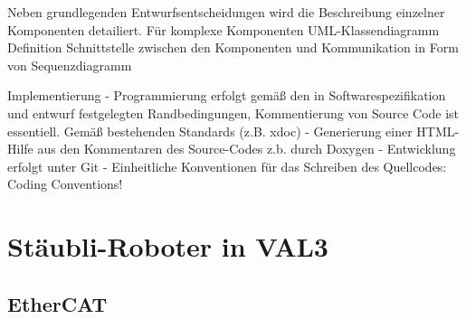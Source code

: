 \documentclass[ a4paper,
                oneside,
                toc=bibliography,
                toc=listof
                ]{scrbook}
\begin{document}
	Neben grundlegenden Entwurfsentscheidungen wird die Beschreibung einzelner Komponenten detailiert. Für komplexe Komponenten UML-Klassendiagramm
	Definition Schnittstelle zwischen den Komponenten und Kommunikation in Form von Sequenzdiagramm
	
	
	Implementierung
	- Programmierung erfolgt gemäß den in Softwarespezifikation und entwurf festgelegten Randbedingungen, Kommentierung von Source Code ist essentiell. Gemäß bestehenden Standards (z.B. xdoc)
	- Generierung einer HTML-Hilfe aus den Kommentaren des Source-Codes z.b. durch Doxygen
	- Entwicklung erfolgt unter Git
	- Einheitliche Konventionen für das Schreiben des Quellcodes: Coding Conventions!
	\section{Stäubli-Roboter in VAL3}
	
	\subsection{EtherCAT}
	
\end{document}
